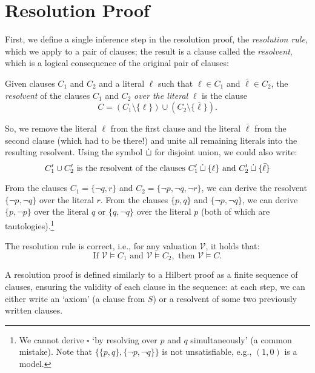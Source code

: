 \section{Resolution Proof}

First, we define a single inference step in the resolution proof, the \emph{resolution rule}, which we apply to a pair of clauses; the result is a clause called the \emph{resolvent}, which is a logical consequence of the original pair of clauses:

\begin{definition}
    Given clauses $C_1$ and $C_2$ and a literal $\ell$ such that $\ell \in C_1$ and $\bar{\ell} \in C_2$, the \emph{resolvent} of the clauses $C_1$ and $C_2$ \emph{over the literal} $\ell$ is the clause
    $$
    C = (C_1 \setminus \{\ell\}) \cup (C_2 \setminus \{\bar{\ell}\}).
    $$
\end{definition}

So, we remove the literal $\ell$ from the first clause and the literal $\bar{\ell}$ from the second clause (which had to be there!) and unite all remaining literals into the resulting resolvent. Using the symbol $\mathbin{\dot{\sqcup}}$ for disjoint union, we could also write:
$$
C_1' \cup C_2' \text{ is the resolvent of the clauses } C_1' \mathbin{\dot{\sqcup}} \{\ell\} \text{ and } C_2' \mathbin{\dot{\sqcup}} \{\bar{\ell}\}
$$

\begin{example}
    From the clauses $C_1 = \{\neg q, r\}$ and $C_2 = \{\neg p, \neg q, \neg r\}$, we can derive the resolvent $\{\neg p, \neg q\}$ over the literal $r$. From the clauses $\{p, q\}$ and $\{\neg p, \neg q\}$, we can derive $\{p, \neg p\}$ over the literal $q$ or $\{q, \neg q\}$ over the literal $p$ (both of which are tautologies).\footnote{We cannot derive $\square$ `by resolving over $p$ and $q$ simultaneously' (a common mistake). Note that $\{\{p, q\}, \{\neg p, \neg q\}\}$ is not unsatisfiable, e.g., $(1,0)$ is a model.}
\end{example}

\begin{observation}
The resolution rule is correct, i.e., for any valuation $\mathcal{V}$, it holds that:
$$
\text{If } \mathcal{V} \models C_1 \text{ and } \mathcal{V} \models C_2, \text{ then } \mathcal{V} \models C.
$$
\end{observation}

A resolution proof is defined similarly to a Hilbert proof as a finite sequence of clauses, ensuring the validity of each clause in the sequence: at each step, we can either write an `axiom' (a clause from $S$) or a resolvent of some two previously written clauses.

